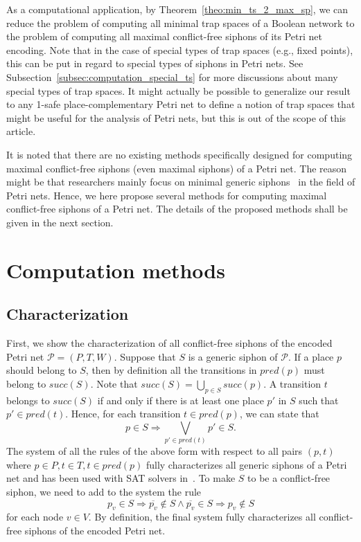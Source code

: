 \documentclass[preprint,12pt]{elsarticle}
\begin{document}
As a computational application, by Theorem~\ref{theo:min_ts_2_max_sp}, we can reduce the problem of computing all minimal trap spaces of a Boolean network to the problem of computing all maximal conflict-free siphons of its Petri net encoding.
Note that in the case of special types of trap spaces (e.g., fixed points), this can be put in regard to special types of siphons in Petri nets.
See Subsection~\ref{subsec:computation_special_ts} for more discussions about many special types of trap spaces.
It might actually be possible to generalize our result to any 1-safe place-complementary Petri net to define a notion of trap spaces that might be useful for the analysis of Petri nets, but this is out of the scope of this article.

It is noted that there are no existing methods specifically designed for computing maximal conflict-free siphons (even maximal siphons) of a Petri net.
The reason might be that researchers mainly focus on minimal generic siphons~\cite{DBLP:journals/isci/LiuB16} in the field of Petri nets. 
Hence, we here propose several methods for computing maximal conflict-free siphons of a Petri net. 
The details of the proposed methods shall be given in the next section.

\section{Computation methods}
\label{sec:Computation}

\subsection{Characterization}
\label{subsec:siphon_characterization}

First, we show the characterization of all conflict-free siphons of the encoded Petri net \(\mathcal{P} = (P, T, W)\). Suppose that \(S\) is a generic siphon of \(\mathcal{P}\). If a place \(p\) should belong to \(S\), then by definition all the transitions in \(pred(p)\) must belong to \(succ(S)\). Note that \(succ(S) = \bigcup_{p \in S}succ(p)\). A transition \(t\) belongs to \(succ(S)\) if and only if there is at least one place \(p'\) in \(S\) such that \(p' \in pred(t)\). Hence, for each transition \(t \in pred(p)\), we can state that
\begin{equation}
\label{eq:siphon}
p \in S \Rightarrow \bigvee_{p' \in pred(t)}p' \in S.
\end{equation}
The system of all the rules of the above form with respect to all pairs \((p, t)\) where \(p \in P, t \in T, t \in pred(p)\) fully characterizes all generic siphons of a Petri net and has been used with SAT solvers in~\cite{oanea2010new,nabli2016enumerating}.
To make \(S\) to be a conflict-free siphon, we need to add to the system the rule
\begin{equation}
\label{eq:conflict}
p_v \in S \Rightarrow \overline{p_v} \not \in S \wedge \overline{p_v} \in S \Rightarrow p_v \not \in S
\end{equation}for each node \(v \in V\).
By definition, the final system fully characterizes all conflict-free siphons of the encoded Petri net.
\end{document}
